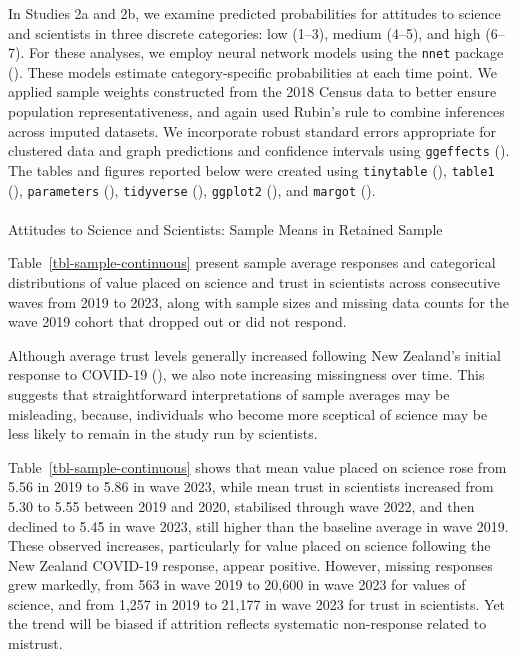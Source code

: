 \documentclass[
  single column]{article}
\makeatletter
\let\oldparagraph\paragraph
\renewcommand{\paragraph}{
    \@ifstar
      \xxxParagraphStar
      \xxxParagraphNoStar
  }
\newcommand{\xxxParagraphStar}[1]{\oldparagraph*{#1}\mbox{}}
\newcommand{\xxxParagraphNoStar}[1]{\oldparagraph{#1}\mbox{}}
\makeatother
\begin{document}
In Studies 2a and 2b, we examine predicted probabilities for attitudes
to science and scientists in three discrete categories: low (1--3),
medium (4--5), and high (6--7). For these analyses, we employ neural
network models using the \texttt{nnet} package
(). These models
estimate category-specific probabilities at each time point. We applied
sample weights constructed from the 2018 Census data to better ensure
population representativeness, and again used Rubin's rule to combine
inferences across imputed datasets. We incorporate robust standard
errors appropriate for clustered data and graph predictions and
confidence intervals using \texttt{ggeffects}
(). The tables and figures
reported below were created using \texttt{tinytable}
(), \texttt{table1}
(), \texttt{parameters}
(),
\texttt{tidyverse} (), \texttt{ggplot2} (),
and \texttt{margot} ().

\paragraph{Attitudes to Science and Scientists: Sample Means in Retained
Sample}\label{attitudes-to-science-and-scientists-sample-means-in-retained-sample}

Table~\ref{tbl-sample-continuous} present sample average responses and
categorical distributions of value placed on science and trust in
scientists across consecutive waves from 2019 to 2023, along with sample
sizes and missing data counts for the wave 2019 cohort that dropped out
or did not respond.

Although average trust levels generally increased following New
Zealand's initial response to COVID-19
(), we also note
increasing missingness over time. This suggests that straightforward
interpretations of sample averages may be misleading, because,
individuals who become more sceptical of science may be less likely to
remain in the study run by scientists.

Table~\ref{tbl-sample-continuous} shows that mean value placed on
science rose from 5.56 in 2019 to 5.86 in wave 2023, while mean trust in
scientists increased from 5.30 to 5.55 between 2019 and 2020, stabilised
through wave 2022, and then declined to 5.45 in wave 2023, still higher
than the baseline average in wave 2019. These observed increases,
particularly for value placed on science following the New Zealand
COVID-19 response, appear positive. However, missing responses grew
markedly, from 563 in wave 2019 to 20,600 in wave 2023 for values of
science, and from 1,257 in 2019 to 21,177 in wave 2023 for trust in
scientists. Yet the trend will be biased if attrition reflects
systematic non-response related to mistrust.
\end{document}
